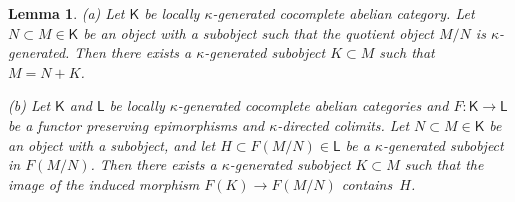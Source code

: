 \documentclass[12pt,a4paper]{amsart}
\newcommand{\+}{\protect\nobreakdash-}
\renewcommand{\:}{\colon}
\newcommand{\rarrow}{\longrightarrow}
\newcommand{\sK}{\mathsf K}
\newcommand{\sL}{\mathsf L}
\theoremstyle{plain}
\newtheorem{lem}[thm]{Lemma}
\theoremstyle{definition}
\begin{document}
\begin{lem} \label{kappa-generated-subobject-lemma}
\textup{(a)} Let\/ $\sK$ be locally\/ $\kappa$\+generated cocomplete
abelian category.
 Let $N\subset M\in\sK$ be an object with a subobject such that
the quotient object $M/N$ is\/ $\kappa$\+generated.
 Then there exists a\/ $\kappa$\+generated subobject $K\subset M$
such that $M=N+K$. \par
\textup{(b)} Let\/ $\sK$ and\/ $\sL$ be locally\/ $\kappa$\+generated
cocomplete abelian categories and $F\:\sK\rarrow\sL$ be a functor
preserving epimorphisms and\/ $\kappa$\+directed colimits.
 Let $N\subset M\in\sK$ be an object with a subobject, and let
$H\subset F(M/N)\in\sL$ be a $\kappa$\+generated subobject in $F(M/N)$.
 Then there exists a\/ $\kappa$\+generated subobject $K\subset M$
such that the image of the induced morphism $F(K)\rarrow F(M/N)$
contains~$H$.
\end{lem}
 
\end{document}
